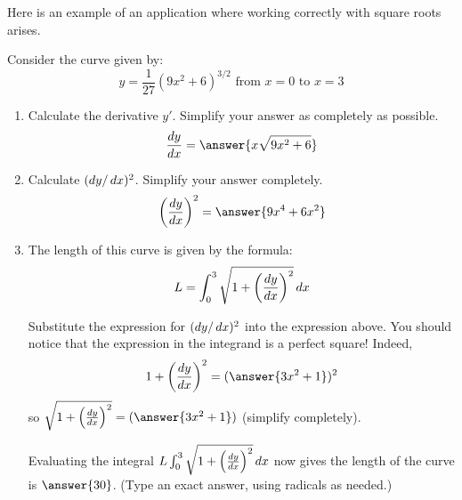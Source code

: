 \documentclass{ximera}
\author{}
\begin{document}
\begin{exercise}

  Here is an example of an application where working correctly with square roots arises.
  
  Consider the curve given by:
  \[
    y = \frac{1}{27} (9x^2 + 6)^{3/2} \text{ from $x = 0$ to $x = 3$}
  \]
  \begin{enumerate}
    \item Calculate the derivative $y'$.
      Simplify your answer as completely as possible.
      \[
        \frac{\d y}{\d x} = \answer{x \sqrt{9x^2 + 6}}
      \]
    
    \item Calculate $(\mathop{}\!d y/ \mathop{}\!d x)^2$.
      Simplify your answer completely.
      \[
        \left( \frac{\d y}{\d x} \right)^2 = \answer{9x^4 + 6x^2}
      \]
      
    \item The length of this curve is given by the formula:
    \[
      L = \int_0^3 \sqrt{1 + \left( \frac{\mathop{}\!d y}{\mathop{}\!d x} \right)^2} \mathop{}\!d x
    \]
    
    Substitute the expression for $(\mathop{}\!d y/ \mathop{}\!d x)^2$ into the expression above.
    You should notice that the expression in the integrand is a perfect square!
    Indeed,
    \[
      1 + \left( \frac{\d y}{\d x} \right)^2 = (\answer{3x^2 + 1})^2
    \]
    so
    $\sqrt{1 + \left( \frac{\d y}{\d x} \right)^2} = (\answer{3x^2 + 1})$ (simplify completely).
    
    Evaluating the integral $L \int_0^3 \sqrt{1 + \left( \frac{\mathop{}\!d y}{\mathop{}\!d x} \right)^2} \mathop{}\!d x$ now gives the length of the curve is $\answer{30}$.
    (Type an exact answer, using radicals as needed.)
  \end{enumerate}


\end{exercise}
\end{document}
